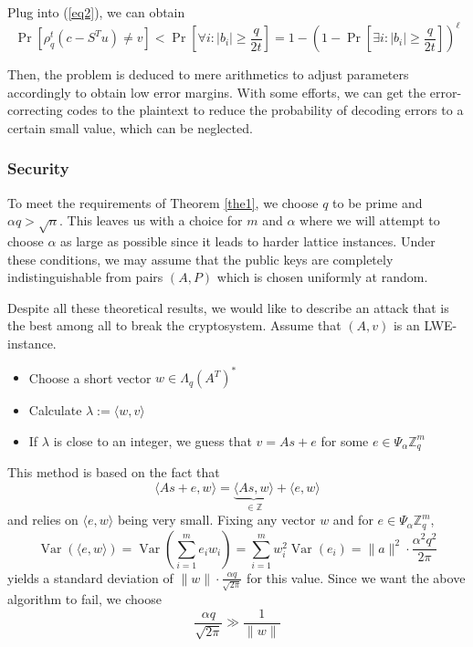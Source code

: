 Plug into (\ref{eq2}), we can obtain
$$\operatorname{Pr}\left[\rho_{q}^{t}\left(c-S^{T} u\right) \neq v\right]<\operatorname{Pr}\left[\forall i :\left|b_{i}\right| \geq \frac{q}{2 t}\right]=1-\left(1-\operatorname{Pr}\left[\exists i :\left|b_{i}\right| \geq \frac{q}{2 t}\right]\right)^{\ell}$$

Then, the problem is deduced to mere arithmetics to adjust parameters accordingly to obtain low error margins. With some efforts, we can get the error-correcting codes to the plaintext to reduce the probability of decoding errors to a certain small value, which can be neglected.

\subsubsection{Security}

To meet the requirements of Theorem \ref{the1}, we choose $q$ to be prime and $\alpha q>\sqrt{n}$. This leaves us with a choice for $m$ and $\alpha$ where we will attempt to choose $\alpha$ as large as possible since it leads to harder lattice instances. Under these conditions, we may assume that the public keys are completely indistinguishable from pairs $(A, P)$ which is chosen uniformly at random. 

Despite all these theoretical results, we would like to describe an attack that is the best among all to break the cryptosystem. Assume that $(A, v)$ is an LWE-instance.

\begin{itemize}
    \item Choose a short vector $w \in \Lambda_{q}\left(A^{T}\right)^{*}$
    \item Calculate $\lambda :=\langle w, v\rangle$
    \item If $\lambda$ is close to an integer, we guess that $v=A s+e$ for some $e \in \Psi_{\alpha} \mathbb{Z}_{q}^{m}$
\end{itemize}

This method is based on the fact that 
$$\langle A s+e, w\rangle=\underbrace{\langle A s, w\rangle}_{\in \mathbb{Z}}+\langle e, w\rangle$$
and relies on $\langle e, w\rangle$ being very small. Fixing any vector $w$ and for $e \in \Psi_{\alpha} \mathbb{Z}_{q}^{m}$,
$$\operatorname{Var}(\langle e, w\rangle)=\operatorname{Var}\left(\sum_{i=1}^{m} e_{i} w_{i}\right)=\sum_{i=1}^{m} w_{i}^{2} \operatorname{Var}\left(e_{i}\right)=\|a\|^{2} \cdot \frac{\alpha^{2} q^{2}}{2 \pi}$$
yields a standard deviation of $\|w\| \cdot \frac{\alpha q}{\sqrt{2 \pi}}$ for this value. Since we want the above algorithm to fail, we choose
\begin{equation}
    \frac{\alpha q}{\sqrt{2 \pi}} \gg \frac{1}{\|w\|}\label{eq3}
\end{equation}

